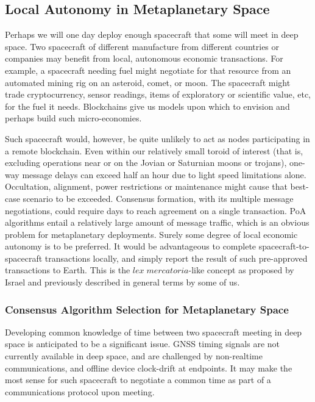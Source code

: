 \documentclass[]{aiaa-tc}%
\begin{document}
\subsection{Local Autonomy in Metaplanetary Space}

Perhaps we will one day deploy enough spacecraft that some will meet in deep space. Two spacecraft of different manufacture from different countries or companies may benefit from local, autonomous economic transactions. For example, a spacecraft needing fuel might negotiate for that resource from an automated mining rig on an asteroid, comet, or moon. The spacecraft might trade cryptocurrency, sensor readings, items of exploratory or scientific value, etc, for the fuel it needs. Blockchains give us models upon which to envision and perhaps build such micro-economies.

Such spacecraft would, however, be quite unlikely to act as nodes participating in a remote blockchain. Even within our relatively small toroid of interest (that is, excluding operations near or on the Jovian or Saturnian moons or trojans), one-way message delays can exceed half an hour due to light speed limitations alone. Occultation, alignment, power restrictions or maintenance might cause that best-case scenario to be exceeded. Consensus formation, with its multiple message negotiations, could require days to reach agreement on a single transaction. PoA algorithms entail a relatively large amount of message traffic, which is an obvious problem for metaplanetary deployments. Surely some degree of local economic autonomy is to be preferred. It would be advantageous to complete spacecraft-to-spacecraft transactions locally, and simply report the result of such pre-approved transactions to Earth. This is the $\mathit{lex\; mercatoria}$-like concept as proposed by Israel\cite{israel_space_2019} and previously described in general terms by some of us\cite{Hyland-Wood_COSPAR2019}.

\subsubsection{Consensus Algorithm Selection for Metaplanetary Space}

Developing common knowledge of time between two spacecraft meeting in deep space is anticipated to be a significant issue. GNSS timing signals are not currently available in deep space, and are challenged by non-realtime communications, and offline device clock-drift at endpoints. It may make the most sense for such spacecraft to negotiate a common time as part of a communications protocol upon meeting.
\end{document}
